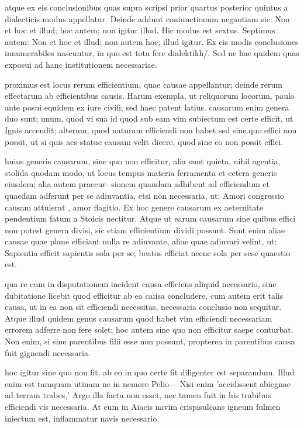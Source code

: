  atque ex eis conclusionibus quas supra scripsi prior quartus posterior quintus a dialecticis modus appellatur. Deinde addunt coniunctionum negantiam sic: Non et hoc et illud; hoc autem; non igitur illud. Hic modus est sextus. Septimus autem: Non et hoc et illud; non autem hoc; illud igitur. Ex eis modis conclusiones innumerabiles nascuntur, in quo est tota fere dialektikh/. Sed ne hae quidem quas exposui ad hanc institutionem necessariae.

 proximus est locus rerum efficientium, quae causae appellantur; deinde rerum effectarum ab efficientibus causis. Harum exempla, ut reliquorum locorum, paulo ante posui equidem ex iure civili; sed haec patent latius. causarum enim genera duo sunt; unum, quod vi sua id quod sub eam vim subiectum est certe efficit, ut Ignis accendit; alterum, quod naturam efficiendi non habet sed sine.quo effici non possit, ut si quis aes statue causam velit dicere, quod sine eo non possit effici.

 huius generis causarum, sine quo non efficitur, alia sunt quieta, nihil agentia, stolida quodam modo, ut locus tempus materia ferramenta et cetera generis eiusdem; alia autem praecur- sionem quandam adhibent ad efficiendum et quaedam adferunt per se adiuvantia, etsi non necessaria, ut: Amori congressio causam attulerat , amor flagitio. Ex hoc genere causarum ex aeternitate pendentium fatum a Stoicis nectitur. Atque ut earum causarum sine quibus effici non potest genera divisi, sic etiam efficientium dividi possunt. Sunt enim aliae causae quae plane efficiant nulla re adiuvante, aliae quae adiuvari velint, ut: Sapientia efficit sapientis sola per se; beatos efficiat necne sola per sese quaestio est.

 qua re cum in disputationem incident causa efficiens aliquid necessario, sine dubitatione licebit quod efficitur ab ea caiisa concludere. cum autem erit talis causa, ut in ea non sit efficiendi necessitas, necessaria conclusio non sequitur. Atque illud quidem genus causarum quod habet vim efficiendi necessariam errorem adferre non fere solet; hoc autem sine quo non efficitur saepe conturbat. Non enim, si sine parentibus filii esse non possunt, propterea in parentibus causa fuit gignendi necessaria.

 hoc igitur sine quo non fit, ab eo in quo certe fit diligenter est separandum. Illud enim est tamquam utinam ne in nemore Pelio— Nisi enim 'accidissent abiegnae ad terram trabes,' Argo illa facta non esset, nec tamen fuit in his trabibus efficiendi vis necessaria. At cum in Aiacis navim crispisulcans igneum fulmen iniectum est, inflammatur navis necessario.

